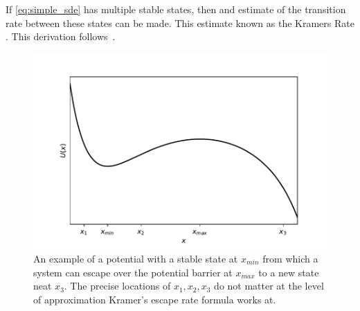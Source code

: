 If \cref{eq:simple_sde} has multiple stable states, then and estimate of the transition rate between these states can be made. This estimate known
as the Kramers Rate \parencite{Kramers1940}. This derivation follows~\cite{Risken1984}.

\begin{figure}
  \centering
  \includegraphics{potential_to_escape}
  \caption{An example of a potential with a stable state at $x_{min}$ from which a system can escape over the potential barrier at $x_{max}$ to a new state neat $x_3$.
  The precise locations of $x_1,x_2,x_3$ do not matter at the level of approximation Kramer's escape rate formula works at.}
  \label{fig:potential_to_escape}
\end{figure}

